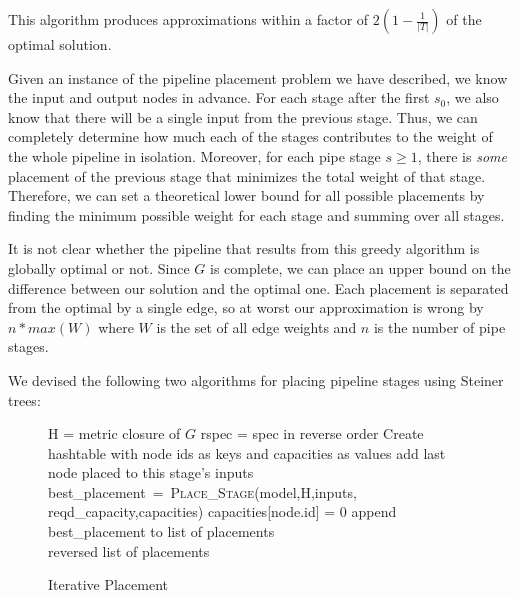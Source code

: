 \documentclass[conference]{IEEEtran}
\begin{document}
	This algorithm produces approximations within a factor of $2(1 - \frac{1}{|T|})$ of the optimal solution.
	
	Given an instance of the pipeline placement problem we have described, we know the input and output nodes in advance. For each stage after the first $s_{0}$, we also know that there will be a single input from the previous stage. Thus, we can completely determine how much each of the stages contributes to the weight of the whole pipeline in isolation. Moreover, for each pipe stage $s \ge 1$, there is \textit{some} placement of the previous stage that minimizes the total weight of that stage. Therefore, we can set a theoretical lower bound for all possible placements by finding the minimum possible weight for each stage and summing over all stages.
	
	It is not clear whether the pipeline that results from this greedy algorithm is globally optimal or not. Since $G$ is complete, we can place an upper bound on the difference between our solution and the optimal one. Each placement is separated from the optimal by a single edge, so at worst our approximation is wrong by $n * max(W)$ where $W$ is the set of all edge weights and $n$ is the number of pipe stages. 
    
	We devised the following two algorithms for placing pipeline stages using Steiner trees:
	\begin{figure}
	\centering
	\begin{algorithmic}[1]
	        \State H = metric closure of $G$
	        \State rspec = spec in reverse order
	        \State Create hashtable with node ids as keys and capacities as values
	                \State add last node placed to this stage's inputs
	            \EndIf
	            \State best\_placement~=~\textsc{Place\_Stage}(model,H,inputs,\\
	            reqd\_capacity,capacities)
	            \State capacities[node.id] = 0
	            \State append best\_placement to list of placements
	        \EndFor \\
	        \Return reversed list of placements
	    \EndProcedure
	\end{algorithmic}
	\caption{Iterative Placement}\label{alg_it}
	\end{figure}
   
\end{document}
